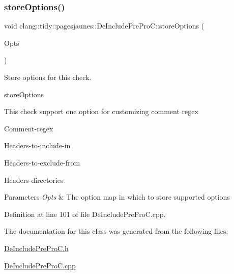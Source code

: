 \subsubsection{\texorpdfstring{store\+Options()}{storeOptions()}}
{\footnotesize\ttfamily void clang\+::tidy\+::pagesjaunes\+::\+De\+Include\+Pre\+Pro\+C\+::store\+Options (\begin{DoxyParamCaption}\item[{Clang\+Tidy\+Options\+::\+Option\+Map \&}]{Opts }\end{DoxyParamCaption})\hspace{0.3cm}{\ttfamily [override]}}



Store options for this check. 

store\+Options

This check support one option for customizing comment regex
\begin{DoxyItemize}
\item Comment-\/regex
\item Headers-\/to-\/include-\/in
\item Headers-\/to-\/exclude-\/from
\item Headers-\/directories
\end{DoxyItemize}


\begin{DoxyParams}{Parameters}
{\em Opts} & The option map in which to store supported options \\
\hline
\end{DoxyParams}


Definition at line 101 of file De\+Include\+Pre\+Pro\+C.\+cpp.



The documentation for this class was generated from the following files\+:\begin{DoxyCompactItemize}
\item 
\hyperlink{_de_include_pre_pro_c_8h}{De\+Include\+Pre\+Pro\+C.\+h}\item 
\hyperlink{_de_include_pre_pro_c_8cpp}{De\+Include\+Pre\+Pro\+C.\+cpp}\end{DoxyCompactItemize}
